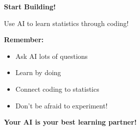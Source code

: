 \documentclass[aspectratio=169]{beamer}
\begin{document}
\begin{frame}
\begin{center}
\Huge \textbf{Start Building!}

\vspace{1em}

\Large Use AI to learn statistics through coding!

\vspace{2em}

\textbf{Remember:} 
\begin{itemize}
\item Ask AI lots of questions
\item Learn by doing
\item Connect coding to statistics
\item Don't be afraid to experiment!
\end{itemize}

\vspace{1em}

\textbf{Your AI is your best learning partner!}
\end{center}
\end{frame}
\end{document}
